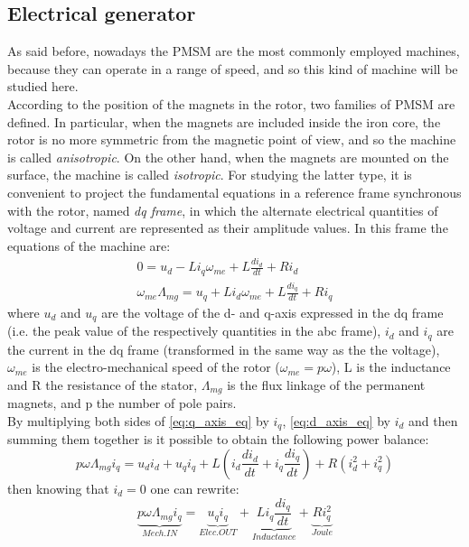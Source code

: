 \subsection{Electrical generator}
As said before, nowadays the \acrfull{PMSM} are the most commonly employed machines, because they can operate in a range of speed, and so this kind of machine will be studied here.\\
According to the position of the magnets in the rotor, two families of \acrshort{PMSM} are defined. In particular, when the magnets are included inside the iron core, the rotor is no more symmetric from the magnetic point of view, and so the machine is called \textit{anisotropic}. On the other hand, when the magnets are mounted on the surface, the machine is called \textit{isotropic}. For studying the latter type, it is convenient to project the fundamental equations in a reference frame synchronous with the rotor, named \textit{dq frame}, in which the alternate electrical quantities of voltage and current are represented as their amplitude values. 
In this frame the equations of the machine are:
\begin{gather}
  0=u_d-Li_q\omega_{me}+L\frac{di_d}{dt}+Ri_d 
  \label{eq:d_axis_eq}\\
  \omega_{me}\Lambda_{mg}=u_q+Li_d\omega_{me}+L\frac{di_q}{dt}+Ri_q
  \label{eq:q_axis_eq}
\end{gather}
where $u_d$ and $u_q$ are the voltage of the d- and q-axis expressed in the dq frame (i.e. the peak value of the respectively quantities in the abc frame), $i_d$ and $i_q$ are the current in the dq frame (transformed in the same way as the the voltage), $\omega_{me}$ is the electro-mechanical speed of the rotor ($\omega_{me}=p\omega$), L is the inductance and R the resistance of the stator, $\Lambda_{mg}$ is the flux linkage of the permanent magnets, and p the number of pole pairs.\\
By multiplying both sides of \autoref{eq:q_axis_eq} by $i_q$, \autoref{eq:d_axis_eq} by $i_d$ and then summing them together is it possible to obtain the following power balance:
\begin{equation}
  p\omega\Lambda_{mg}i_q=u_di_d + u_qi_q+ L\left(i_d\frac{di_d}{dt} + i_q\frac{di_q}{dt}\right) + R(i_d^2 + i_q^2)
  \label{eq:gen_power_balance}
\end{equation}
then knowing that $i_d=0$ one can rewrite:
\begin{equation}
  \underbrace{p\omega\Lambda_{mg}i_q}_{Mech. IN} = \underbrace{u_qi_q}_{Elec. OUT}+ \underbrace{L i_q\frac{di_q}{dt}}_{Inductance} + \underbrace{Ri_q^2}_{Joule}
  \label{eq:gen_power_balance2}
\end{equation}
